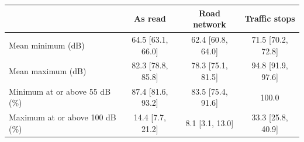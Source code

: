 \begin{tabular}{lccc}
\toprule
 & As read & Road network & Traffic stops \\
\midrule
Mean minimum (dB) & 64.5 [63.1, 66.0] & 62.4 [60.8, 64.0] & 71.5 [70.2, 72.8] \\
Mean maximum (dB) & 82.3 [78.8, 85.8] & 78.3 [75.1, 81.5] & 94.8 [91.9, 97.6] \\
Minimum at or above 55 dB (\%) & 87.4 [81.6, 93.2] & 83.5 [75.4, 91.6] & 100.0 \\
Maximum at or above 100 dB (\%) & 14.4 [7.7, 21.2] & 8.1 [3.1, 13.0] & 33.3 [25.8, 40.9] \\
\bottomrule
\end{tabular}
